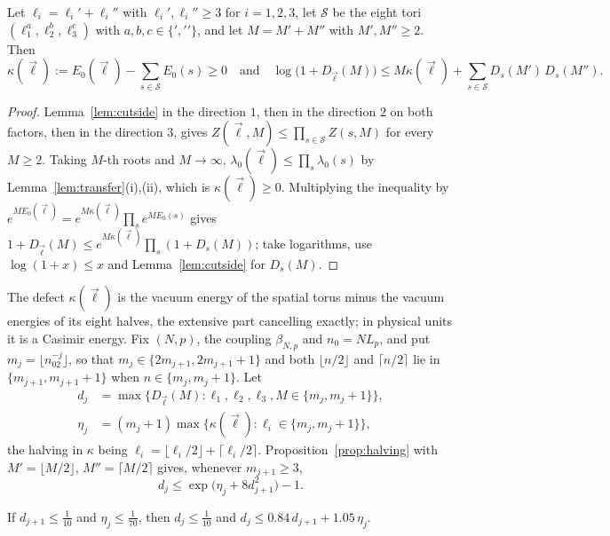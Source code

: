 \begin{proposition}[halving]\label{prop:halving}
Let $\ell_i=\ell_i'+\ell_i''$ with $\ell_i',\ell_i''\ge3$ for $i=1,2,3$, let
$\mathcal S$ be the eight tori $(\ell_1^a,\ell_2^b,\ell_3^c)$ with $a,b,c\in
\{\prime,\prime\prime\}$, and let $M=M'+M''$ with $M',M''\ge2$. Then
\[
\kappa(\vec\ell):=E_0(\vec\ell)-\sum_{s\in\mathcal S}E_0(s)\ge0
\quad\text{and}\quad
\log\bigl(1+D_{\vec\ell}(M)\bigr)\le M\kappa(\vec\ell)+\sum_{s\in\mathcal S}
D_s(M')\,D_s(M'') .
\]
\end{proposition}

\begin{proof}
Lemma~\ref{lem:cutside} in the direction $1$, then in the direction $2$ on
both factors, then in the direction $3$, gives $Z(\vec\ell,M)\le\prod_{s\in
\mathcal S}Z(s,M)$ for every $M\ge2$. Taking $M$-th roots and $M\to\infty$,
$\lambda_0(\vec\ell)\le\prod_s\lambda_0(s)$ by
Lemma~\ref{lem:transfer}(i),(ii), which is $\kappa(\vec\ell)\ge0$.
Multiplying the inequality by $e^{ME_0(\vec\ell)}=e^{M\kappa(\vec\ell)}
\prod_se^{ME_0(s)}$ gives $1+D_{\vec\ell}(M)\le e^{M\kappa(\vec\ell)}\prod_s
(1+D_s(M))$; take logarithms, use $\log(1+x)\le x$ and
Lemma~\ref{lem:cutside} for $D_s(M)$.
\end{proof}

The defect $\kappa(\vec\ell)$ is the vacuum energy of the spatial torus
minus the vacuum energies of its eight halves, the extensive part
cancelling exactly; in physical units it is a Casimir energy. Fix $(N,p)$,
the coupling $\beta_{N,p}$ and $n_0=NL_p$, and put $m_j=\lfloor n_02^{-j}
\rfloor$, so that $m_j\in\{2m_{j+1},2m_{j+1}+1\}$ and both $\lfloor n/2\rfloor$
and $\lceil n/2\rceil$ lie in $\{m_{j+1},m_{j+1}+1\}$ when $n\in\{m_j,m_j+1\}$.
Let
\begin{align*}
d_j&=\max\bigl\{D_{\vec\ell}(M):\ell_1,\ell_2,\ell_3,M\in\{m_j,m_j+1\}\bigr\},\\
\eta_j&=(m_j+1)\max\bigl\{\kappa(\vec\ell):\ell_i\in\{m_j,m_j+1\}\bigr\},
\end{align*}
the halving in $\kappa$ being $\ell_i=\lfloor\ell_i/2\rfloor+\lceil\ell_i/2
\rceil$. Proposition~\ref{prop:halving} with $M'=\lfloor M/2\rfloor$,
$M''=\lceil M/2\rceil$ gives, whenever $m_{j+1}\ge3$,
\begin{equation}\label{eq:halvingrecursion}
d_j\le\exp\bigl(\eta_j+8d_{j+1}^2\bigr)-1 .
\end{equation}

\begin{lemma}[contraction]\label{lem:halvingcontraction}
If $d_{j+1}\le\frac1{10}$ and $\eta_j\le\frac1{70}$, then $d_j\le\frac1{10}$
and $d_j\le0.84\,d_{j+1}+1.05\,\eta_j$.
\end{lemma}

